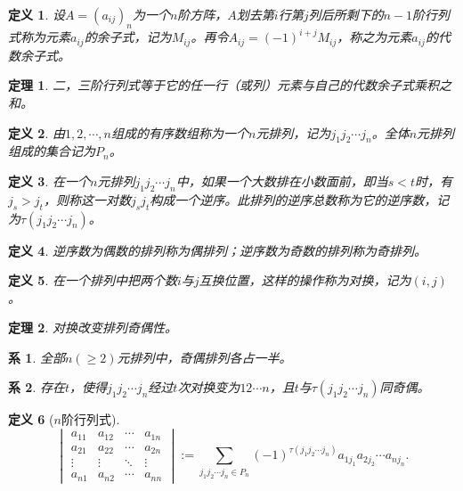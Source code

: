 \documentclass[a4paper]{book}
\newtheorem{Def}{定义}[chapter]
\newtheorem{cor}{系}[chapter]
\newtheorem{thm}{定理}[chapter]
\begin{document}
\begin{Def}
设$A = (a_{ij})_n$为一个$n$阶方阵，$A$划去第$i$行第$j$列后所剩下的$n-1$阶行列式称为元素$a_{ij}$的余子式，记为$M_{ij}$。再令$A_{ij} = (-1)^{i+j}M_{ij}$，称之为元素$a_{ij}$的代数余子式。
\end{Def}

\begin{thm}
二，三阶行列式等于它的任一行（或列）元素与自己的代数余子式乘积之和。
\end{thm}

\begin{Def}
由$1,2,\cdots,n$组成的有序数组称为一个$n$元排列，记为$j_1j_2\cdots j_n$。全体$n$元排列组成的集合记为$P_n$。
\end{Def}

\begin{Def}
在一个$n$元排列$j_1j_2\cdots j_n$中，如果一个大数排在小数面前，即当$s<t$时，有$j_s>j_t$，则称这一对数$j_sj_t$构成一个逆序。此排列的逆序总数称为它的逆序数，记为$\tau(j_1j_2\cdots j_n)$。
\end{Def}

\begin{Def}
逆序数为偶数的排列称为偶排列；逆序数为奇数的排列称为奇排列。
\end{Def}

\begin{Def}
在一个排列中把两个数$i$与$j$互换位置，这样的操作称为对换，记为$(i, j)$。
\end{Def}

\begin{thm}
对换改变排列奇偶性。
\end{thm}

\begin{cor}
全部$n(\geqslant 2)$元排列中，奇偶排列各占一半。
\end{cor}

\begin{cor}
存在$t$，使得$j_1j_2\cdots j_n$经过$t$次对换变为$12\cdots n$，且$t$与$\tau(j_1j_2\cdots j_n)$同奇偶。
\end{cor}

\begin{Def}[$n$阶行列式]
$$\begin{vmatrix}
a_{11} & a_{12} & \cdots & a_{1n} \\ a_{21} & a_{22} & \cdots & a_{2n} \\ \vdots & \vdots & \ddots & \vdots \\ a_{n1} & a_{n2} & \cdots & a_{nn}
\end{vmatrix} := \sum\limits_{j_1j_2\cdots j_n \in P_n} (-1)^{\tau(j_1j_2\cdots j_n)} a_{1j_1}a_{2j_2}\cdots a_{nj_n}.$$
\end{Def}
\end{document}
